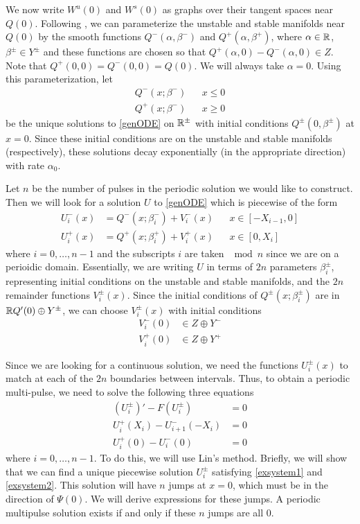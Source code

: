 \documentclass[thesis.tex]{subfiles}
\begin{document}
We now write $W^u(0)$ and $W^s(0)$ as graphs over their tangent spaces near $Q(0)$. Following \cite{Sandstede1997}, we can parameterize the unstable and stable manifolds near $Q(0)$ by the smooth functions $Q^-(\alpha, \beta^-)$ and $Q^+(\alpha, \beta^+)$, where $\alpha \in {\mathbb R}$, $\beta^\pm \in Y^\pm$ and these functions are chosen so that $Q^+(\alpha, 0) - Q^-(\alpha, 0) \in Z$. Note that $Q^+(0, 0) = Q^-(0, 0) = Q(0)$. We will always take $\alpha = 0$. Using this parameterization, let
\begin{align*}
Q^-(x; \beta^-) && x \leq 0 \\
Q^+(x; \beta^-) && x \geq 0
\end{align*}
be the unique solutions to \eqref{genODE} on ${\mathbb R}^\pm$ with initial conditions $Q^\pm(0, \beta^\pm)$ at $x = 0$. Since these initial conditions are on the unstable and stable manifolds (respectively), these solutions decay exponentially (in the appropriate direction) with rate $\alpha_0$.

Let $n$ be the number of pulses in the periodic solution we would like to construct. Then we will look for a solution $U$ to \eqref{genODE} which is piecewise of the form
\begin{equation}\label{Upiecewise}
\begin{aligned}
U_i^-(x) &= Q^-(x; \beta_i^-) + V_i^-(x) && x \in [-X_{i-1}, 0] \\
U_i^+(x) &= Q^+(x; \beta_i^+) + V_i^+(x) && x \in [0, X_i]
\end{aligned}
\end{equation}
where $i = 0, \dots, n-1$ and the subscripts $i$ are taken $\mod n$ since we are on a perioidic domain. Essentially, we are writing $U$ in terms of $2n$ parameters $\beta_i^\pm$, representing initial conditions on the unstable and stable manifolds, and the $2n$ remainder functions $V_i^\pm(x)$. Since the initial conditions of $Q^\pm(x; \beta_i^\pm)$ are in ${\mathbb R} Q'(0) \oplus Y^\pm$, we can choose $V_i^\pm(x)$ with initial conditions
\begin{align*}
V_i^-(0) &\in Z \oplus Y^- \\
V_i^+(0) &\in Z \oplus Y^+
\end{align*}

Since we are looking for a continuous solution, we need the functions $U_i^\pm(x)$ to match at each of the $2n$ boundaries between intervals. Thus, to obtain a periodic multi-pulse, we need to solve the following three equations
\begin{align}
(U_i^\pm)' - F(U_i^\pm) &= 0 \label{exsystem1} \\
U_i^+(X_i) - U_{i+1}^-(-X_i) &= 0 \label{exsystem2} \\
U_i^+(0) - U_i^-(0) &= 0 \label{exsystem3}
\end{align}
where $i = 0, \dots, n-1$. To do this, we will use Lin's method. Briefly, we will show that we can find a unique piecewise solution $U_i^\pm$ satisfying \eqref{exsystem1} and \eqref{exsystem2}. This solution will have $n$ jumps at $x = 0$, which must be in the direction of $\Psi(0)$. We will derive expressions for these jumps. A periodic multipulse solution exists if and only if these $n$ jumps are all 0.
\end{document}
